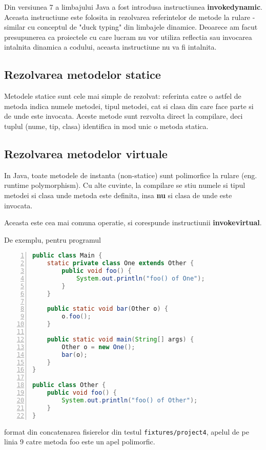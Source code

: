 Din versiunea 7 a limbajului Java a fost introdusa instructiunea
\textbf{invokedynamic}.
Aceasta instructiune este folosita in rezolvarea referintelor de metode la
rulare - similar cu conceptul de "duck typing" din limbajele dinamice.
Deoarece am facut presupunerea ca proiectele cu care lucram nu vor utiliza
reflectia sau invocarea intalnita dinamica a codului, aceasta instructiune nu va
fi intalnita.

\subsection{Rezolvarea metodelor statice}

Metodele statice sunt cele mai simple de rezolvat: referinta catre o astfel de
metoda indica numele metodei, tipul metodei, cat si clasa din care face parte si
de unde este invocata.
Aceste metode sunt rezvolta direct la compilare, deci tuplul (nume, tip, clasa)
identifica in mod unic o metoda statica.

\subsection{Rezolvarea metodelor virtuale}

In Java, toate metodele de instanta (non-statice) sunt polimorfice la rulare
(eng. runtime polymorphism).
Cu alte cuvinte, la compilare se stiu numele si tipul metodei si clasa unde
metoda este definita, insa \textbf{nu} si clasa de unde este invocata.

Aceasta este cea mai comuna operatie, si corespunde instructiunii
\textbf{invokevirtual}.

De exemplu, pentru programul
\begin{lstlisting}[language=Java, numbers=left, label=program_metode_virtuale]
public class Main {
    static private class One extends Other {
        public void foo() {
            System.out.println("foo() of One");
        }
    }

    public static void bar(Other o) {
        o.foo();
    }

    public static void main(String[] args) {
        Other o = new One();
        bar(o);
    }
}

public class Other {
    public void foo() {
        System.out.println("foo() of Other");
    }
}
\end{lstlisting}
format din concatenarea fisierelor din testul \texttt{fixtures/project4},
apelul de pe linia 9 catre metoda foo este un apel polimorfic.


